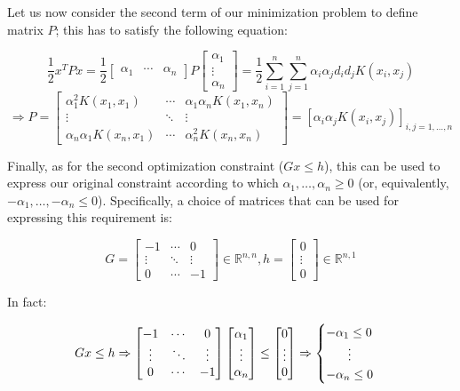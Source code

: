 \documentclass[letterpaper,headings=standardclasses]{scrartcl}
\begin{document}
Let us now consider the second term of our minimization problem to define matrix $P$; this has to satisfy the following equation:

$$ \frac{1}{2} x^T P x = \frac{1}{2} \left[ \begin{matrix} \alpha_1 & \cdots & \alpha_n \end{matrix} \right] P \left[ \begin{matrix} \alpha_1 \\ \vdots \\ \alpha_n \end{matrix} \right] = \frac{1}{2} \sum_{i = 1}^n \sum_{j = 1}^n \alpha_i \alpha_j d_i d_j K(x_i, x_j) $$
$$ \Rightarrow P = \left[ \begin{matrix} \alpha_1^2 K(x_1, x_1) & \cdots & \alpha_1 \alpha_n K(x_1, x_n) \\ \vdots & \ddots & \vdots \\ \alpha_n \alpha_1 K(x_n, x_1) & \cdots & \alpha_n^2 K(x_n, x_n) \end{matrix} \right] = \left[ \alpha_i \alpha_j K(x_i, x_j) \right]_{i,j = 1, \dots, n} $$

Finally, as for the second optimization constraint ($Gx \le h$), this can be used to express our original constraint according to which $\alpha_1, \dots, \alpha_n \ge 0$ (or, equivalently, $-\alpha_1, \dots, -\alpha_n \le 0$). Specifically, a choice of matrices that can be used for expressing this requirement is:

$$ G = \left[ \begin{matrix} -1 & \cdots & 0 \\ \vdots & \ddots & \vdots \\ 0 & \cdots & -1 \end{matrix} \right] \in \mathbb{R}^{n,n}, h = \left[ \begin{matrix} 0 \\ \vdots \\ 0 \end{matrix} \right] \in \mathbb{R}^{n,1} $$

In fact:

$$ Gx \le h \Rightarrow \left[ \begin{matrix} -1 & \cdots & 0 \\ \vdots & \ddots & \vdots \\ 0 & \cdots & -1 \end{matrix} \right] \left[ \begin{matrix} \alpha_1 \\ \vdots \\ \alpha_n \end{matrix} \right] \le \left[ \begin{matrix} 0 \\ \vdots \\ 0 \end{matrix} \right] \Rightarrow \begin{cases} -\alpha_1 \le 0 \\ \hfil \vdots \\ -\alpha_n \le 0 \end{cases} $$
\end{document}
